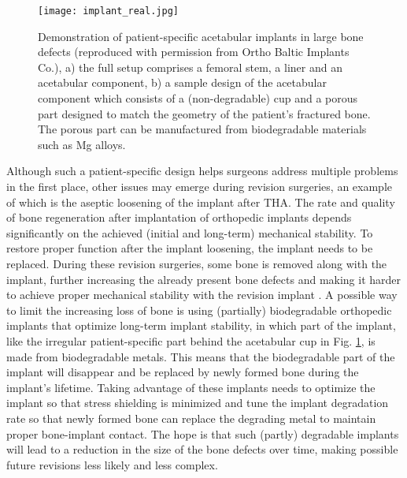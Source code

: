 \begin{figure}[htpb]
\centering
\medskip
\texttt{[image: implant\_real.jpg]}
\caption[Full setup of patient-specific acetabular implants]{Demonstration of patient-specific acetabular implants in large bone defects (reproduced with permission from Ortho Baltic Implants Co.\protect\footnotemark), a) the full setup comprises a femoral stem, a liner and an acetabular component, b) a sample design of the acetabular component which consists of a (non-degradable) cup and a porous part designed to match the geometry of the patient's fractured bone. The porous part can be manufactured from biodegradable materials such as Mg alloys.} \label{fig:cup_implant_real}
\end{figure}

Although such a patient-specific design helps surgeons address multiple problems in the first place, other issues may emerge during revision surgeries, an example of which is the aseptic loosening of the implant after \gls{THA}. The rate and quality of bone regeneration after implantation of orthopedic implants depends significantly on the achieved (initial and long-term) mechanical stability. To restore proper function after the implant loosening, the implant needs to be replaced. During these revision surgeries, some bone is removed along with the implant, further increasing the already present bone defects and making it harder to achieve proper mechanical stability with the revision implant \cite{Luthringer2014}. A possible way to limit the increasing loss of bone is using (partially) biodegradable orthopedic implants that optimize long-term implant stability, in which part of the implant, like the irregular patient-specific part behind the acetabular cup in Fig. \ref{fig:cup_implant_real}, is made from biodegradable metals. This means that the biodegradable part of the implant will disappear and be replaced by newly formed bone during the implant's lifetime. Taking advantage of these implants needs to optimize the implant so that stress shielding is minimized and tune the implant degradation rate so that newly formed bone can replace the degrading metal to maintain proper bone-implant contact. The hope is that such (partly) degradable implants will lead to a reduction in the size of the bone defects over time, making possible future revisions less likely and less complex.


